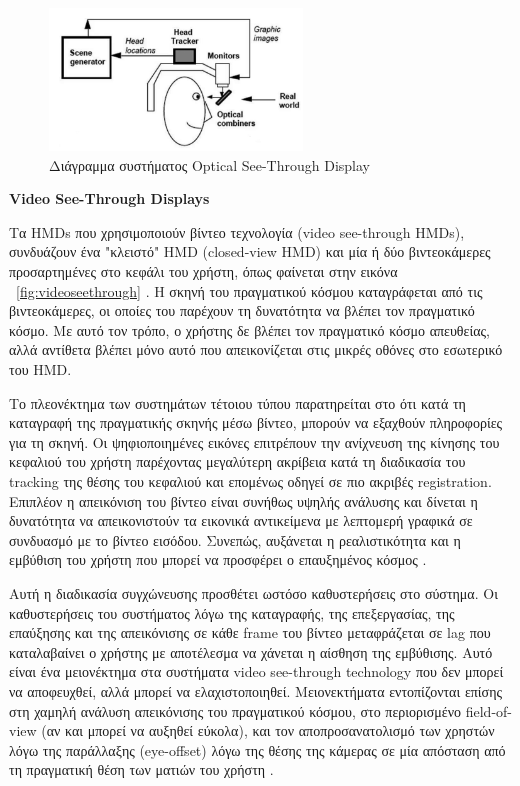 \begin{figure}[H]
    \centering
    \includegraphics[width=0.6\textwidth]{Files/Figures/optical.jpg}
    \caption[Διάγραμμα συστήματος Optical See-Through Display]{ Διάγραμμα συστήματος Optical See-Through Display \cite{azuma1997}}
    \label{fig:opticalseethrough}
\end{figure}



\textbf{Video See-Through Displays}

Τα HMDs που χρησιμοποιούν βίντεο τεχνολογία (video see-through HMDs), συνδυάζουν ένα "κλειστό" HMD (closed-view HMD) και μία ή δύο βιντεοκάμερες προσαρτημένες στο κεφάλι του χρήστη, όπως φαίνεται στην εικόνα ~\ref{fig:videoseethrough} . Η σκηνή του πραγματικού κόσμου καταγράφεται από τις βιντεοκάμερες, οι οποίες του παρέχουν τη δυνατότητα να βλέπει τον πραγματικό κόσμο. Με αυτό τον τρόπο, ο χρήστης δε βλέπει τον πραγματικό κόσμο απευθείας, αλλά αντίθετα βλέπει μόνο αυτό που απεικονίζεται στις μικρές οθόνες στο εσωτερικό του HMD.  

 

Το πλεονέκτημα των συστημάτων τέτοιου τύπου παρατηρείται στο ότι κατά τη καταγραφή της πραγματικής σκηνής μέσω βίντεο, μπορούν να εξαχθούν πληροφορίες για τη σκηνή. Οι ψηφιοποιημένες εικόνες επιτρέπουν την ανίχνευση της κίνησης του κεφαλιού του χρήστη παρέχοντας μεγαλύτερη ακρίβεια κατά τη διαδικασία του tracking της θέσης του κεφαλιού και επομένως οδηγεί σε πιο ακριβές registration. Επιπλέον η απεικόνιση του βίντεο είναι συνήθως υψηλής ανάλυσης και δίνεται η δυνατότητα να απεικονιστούν τα εικονικά αντικείμενα με λεπτομερή γραφικά σε συνδυασμό με το βίντεο εισόδου. Συνεπώς, αυξάνεται η ρεαλιστικότητα και η εμβύθιση του χρήστη που μπορεί να προσφέρει ο επαυξημένος κόσμος \cite{krevelen2010} .


Αυτή η διαδικασία συγχώνευσης προσθέτει ωστόσο καθυστερήσεις στο σύστημα. Οι καθυστερήσεις του συστήματος λόγω της καταγραφής, της επεξεργασίας, της επαύξησης και της απεικόνισης σε κάθε frame του βίντεο μεταφράζεται σε lag που καταλαβαίνει ο χρήστης με αποτέλεσμα να χάνεται η αίσθηση της εμβύθισης. Αυτό είναι ένα μειονέκτημα στα συστήματα video see-through technology που δεν μπορεί να αποφευχθεί, αλλά μπορεί να ελαχιστοποιηθεί. Μειονεκτήματα εντοπίζονται επίσης στη χαμηλή ανάλυση απεικόνισης του πραγματικού κόσμου, στο περιορισμένο field-of-view (αν και μπορεί να αυξηθεί εύκολα), και τον αποπροσανατολισμό των χρηστών λόγω της παράλλαξης (eye-offset) λόγω της θέσης της κάμερας σε μία απόσταση από τη πραγματική θέση των ματιών του χρήστη \cite{Malik2002} . 



